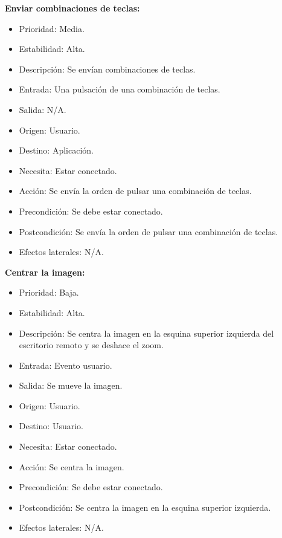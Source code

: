 \textbf{Enviar combinaciones de teclas:}
\begin{itemize}
\item Prioridad: Media.
\item Estabilidad: Alta.
\item Descripción: Se envían combinaciones de teclas.
\item Entrada: Una pulsación de una combinación de teclas.
\item Salida: N/A.
\item Origen: Usuario.
\item Destino: Aplicación.
\item Necesita: Estar conectado.
\item Acción: Se envía la orden de pulsar una combinación de teclas.
\item Precondición: Se debe estar conectado.
\item Postcondición: Se envía la orden de pulsar una combinación de teclas.
\item Efectos laterales: N/A.\\

\end{itemize}
\newpage
\textbf{Centrar la imagen:}
\begin{itemize}
\item Prioridad: Baja.
\item Estabilidad: Alta.
\item Descripción: Se centra la imagen en la esquina superior izquierda del escritorio remoto y se deshace el zoom.
\item Entrada: Evento usuario.
\item Salida: Se mueve la imagen.
\item Origen: Usuario.
\item Destino: Usuario.
\item Necesita: Estar conectado.
\item Acción: Se centra la imagen.
\item Precondición: Se debe estar conectado.
\item Postcondición: Se centra la imagen en la esquina superior izquierda.
\item Efectos laterales: N/A.\\

\end{itemize}


